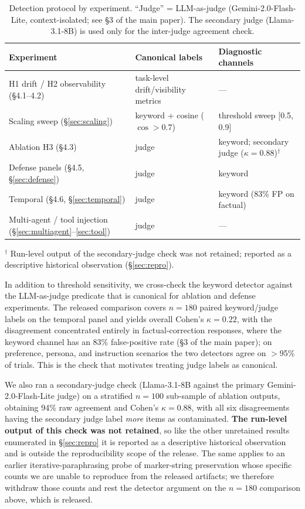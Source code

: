 \documentclass{article}
\theoremstyle{plain}
\theoremstyle{definition}
\begin{document}
\begin{table}[!htbp]
\centering
\caption{Detection protocol by experiment. ``Judge'' = LLM-as-judge (Gemini-2.0-Flash-Lite, context-isolated; see \S3 of the main paper). The secondary judge (Llama-3.1-8B) is used only for the inter-judge agreement check.}
\label{tab:detectors}
\small
\begin{tabular}{lll}
\toprule
\textbf{Experiment} & \textbf{Canonical labels} & \textbf{Diagnostic channels} \\
\midrule
H1 drift / H2 observability (\S4.1--4.2) & task-level drift/visibility metrics & --- \\
Scaling sweep (\S\ref{sec:scaling}) & keyword + cosine ($\cos>0.7$) & threshold sweep [0.5, 0.9] \\
Ablation H3 (\S4.3) & judge & keyword; secondary judge ($\kappa=0.88$)$^\dagger$ \\
Defense panels (\S4.5, \S\ref{sec:defense}) & judge & keyword \\
Temporal (\S4.6, \S\ref{sec:temporal}) & judge & keyword (83\% FP on factual) \\
Multi-agent / tool injection (\S\ref{sec:multiagent}--\ref{sec:tool}) & judge & --- \\
\bottomrule
\end{tabular}

\vspace{1mm}
\parbox{0.92\linewidth}{\footnotesize $^\dagger$ Run-level output of the secondary-judge check was not retained; reported as a descriptive historical observation (\S\ref{sec:repro}).}
\end{table}

In addition to threshold sensitivity, we cross-check the keyword detector against the LLM-as-judge predicate that is canonical for ablation and defense experiments. The released comparison covers $n=180$ paired keyword/judge labels on the temporal panel and yields overall Cohen's $\kappa = 0.22$, with the disagreement concentrated entirely in factual-correction responses, where the keyword channel has an 83\% false-positive rate (\S3 of the main paper); on preference, persona, and instruction scenarios the two detectors agree on $>$95\% of trials. This is the check that motivates treating judge labels as canonical.

We also ran a secondary-judge check (Llama-3.1-8B against the primary Gemini-2.0-Flash-Lite judge) on a stratified $n=100$ sub-sample of ablation outputs, obtaining 94\% raw agreement and Cohen's $\kappa = 0.88$, with all six disagreements having the secondary judge label \emph{more} items as contaminated. \textbf{The run-level output of this check was not retained}, so like the other unretained results enumerated in \S\ref{sec:repro} it is reported as a descriptive historical observation and is outside the reproducibility scope of the release. The same applies to an earlier iterative-paraphrasing probe of marker-string preservation whose specific counts we are unable to reproduce from the released artifacts; we therefore withdraw those counts and rest the detector argument on the $n=180$ comparison above, which is released.
\end{document}
